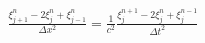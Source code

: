 \documentclass[preview]{standalone}
\begin{document}
\begin{align*}
\frac{\xi_{j+1}^{n} - 2 \xi_{j}^{n} + \xi_{j-1}^{n}}{\Delta x^2} = \frac{1}{c^2}\frac{\xi_{j}^{n+1} - 2 \xi_{j}^{n} + \xi_{j}^{n-1}}{\Delta t^2}
\end{align*}
\end{document}
